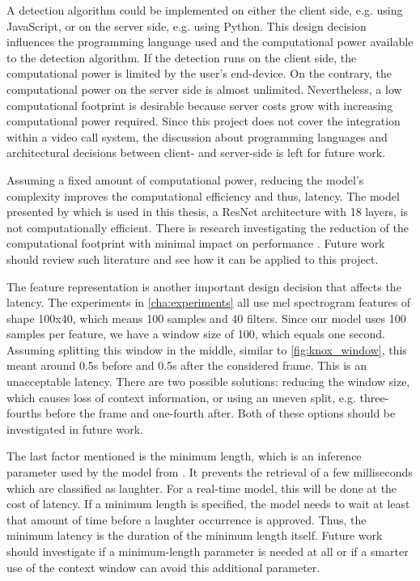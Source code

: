\documentclass[bsc,frontabs,parskip,deptreport]{infthesis}
\begin{document}
A detection algorithm could be implemented on either the client side, e.g. using JavaScript, or on the server side, e.g. using Python. 
This design decision influences the programming language used and the computational power available to the detection algorithm. If the detection runs on the client side, the computational power is limited by the user's end-device. On the contrary, the computational power on the server side is almost unlimited. Nevertheless, a low computational footprint is desirable because server costs grow with increasing computational power required.
Since this project does not cover the integration within a video call system, the discussion about programming languages and architectural decisions between client- and server-side is left for future work.

Assuming a fixed amount of computational power, reducing the model's complexity improves the computational efficiency and thus, latency.
The model presented by \citet{gillick2021robust} which is used in this thesis, a ResNet architecture with 18 layers, is not computationally efficient. There is research investigating the reduction of the computational footprint with minimal impact on performance \cite{sorensen2020depthwise}. Future work should review such literature and see how it can be applied to this project. 

The feature representation is another important design decision that affects the latency.
The experiments in \autoref{cha:experiments} all use mel spectrogram features of shape 100x40, which means 100 samples and 40 filters. 
Since our model uses 100 samples per feature, we have a window size of 100, which equals one second.
Assuming splitting this window in the middle, similar to \autoref{fig:knox_window}, this meant around 0.5s before and 0.5s after the considered frame. This is an unacceptable latency.
There are two possible solutions: reducing the window size, which causes loss of context information, or using an uneven split, e.g. three-fourths before the frame and one-fourth after. 
Both of these options should be investigated in future work.

The last factor mentioned is the minimum length, which is an inference parameter used by the model from \citet{gillick2021robust}. It prevents the retrieval of a few milliseconds which are classified as laughter. For a real-time model, this will be done at the cost of latency. If a minimum length is specified, the model needs to wait at least that amount of time before a laughter occurrence is approved. Thus, the minimum latency is the duration of the minimum length itself.
Future work should investigate if a minimum-length parameter is needed at all or if a smarter use of the context window can avoid this additional parameter.
\end{document}

